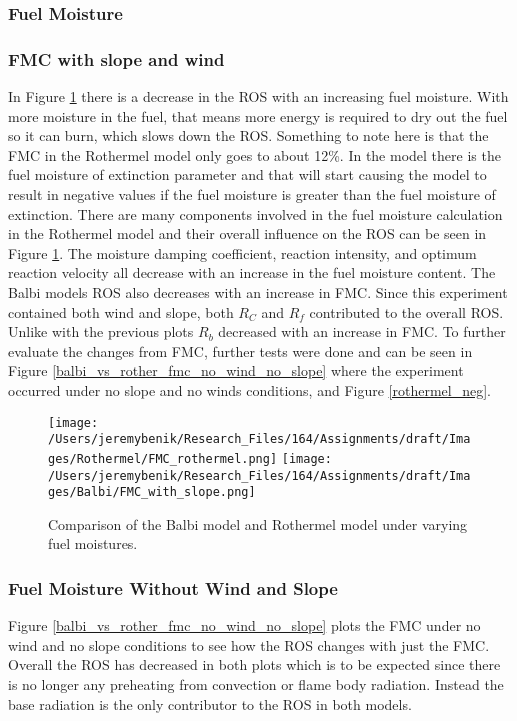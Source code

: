 \documentclass{article}
\begin{document}
\subsubsection{Fuel Moisture}
\subsubsection*{FMC with slope and wind}
\indent In Figure \ref{FMC} there is a decrease in the ROS with an increasing fuel moisture. With more moisture in the fuel, that means more energy is required to dry out the fuel so it can burn, which slows down the ROS. Something to note here is that the FMC in the Rothermel model only goes to about 12\%. In the model there is the fuel moisture of extinction parameter and that will start causing the model to result in negative values if the fuel moisture is greater than the fuel moisture of extinction. There are many components involved in the fuel moisture calculation in the Rothermel model and their overall influence on the ROS can be seen in Figure \ref{FMC}. The moisture damping coefficient, reaction intensity, and optimum reaction velocity all decrease with an increase in the fuel moisture content. The Balbi models ROS also decreases with an increase in FMC. Since this experiment contained both wind and slope, both $R_C$ and $R_f$ contributed to the overall ROS. Unlike with the previous plots $R_b$ decreased with an increase in FMC. To further evaluate the changes from FMC, further tests were done and can be seen in Figure \ref{balbi_vs_rother_fmc_no_wind_no_slope} where the experiment occurred under no slope and no winds conditions, and Figure \ref{rothermel_neg}. \\
\newpage
\begin{figure}[!h]
\centering
  \texttt{[image: /Users/jeremybenik/Research\_Files/164/Assignments/draft/Images/Rothermel/FMC\_rothermel.png]}
  \texttt{[image: /Users/jeremybenik/Research\_Files/164/Assignments/draft/Images/Balbi/FMC\_with\_slope.png]}
  \caption{Comparison of the Balbi model and Rothermel model under varying fuel moistures.}
  \label{FMC}
\end{figure}
\subsubsection*{Fuel Moisture Without Wind and Slope}
\indent Figure \ref{balbi_vs_rother_fmc_no_wind_no_slope} plots the FMC under no wind and no slope conditions to see how the ROS changes with just the FMC. Overall the ROS has decreased in both plots which is to be expected since there is no longer any preheating from convection or flame body radiation. Instead the base radiation is the only contributor to the ROS in both models.
\newpage
\end{document}
